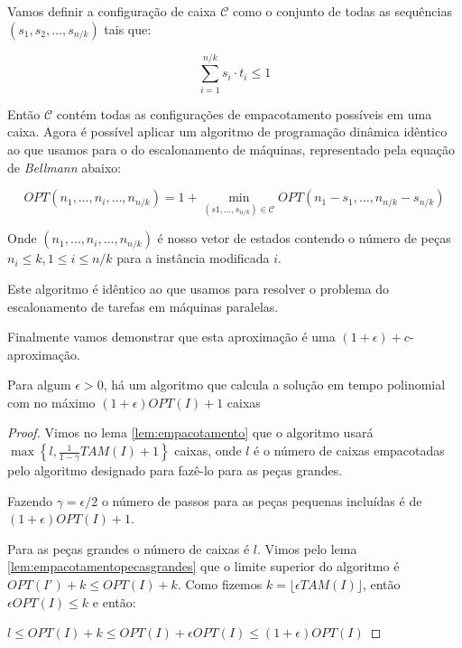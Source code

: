 Vamos definir a configuração de caixa  $ \mathcal{C} $ como o conjunto de todas as sequências $(s_1,s_2,\ldots,s_{n/k})$ tais que:

\begin{equation}
\sum_{i=1}^{n/k} s_i \cdot t_i \leq 1
\end{equation}

Então $ \mathcal{C} $ contém todas as configurações de empacotamento possíveis em uma caixa. Agora é possível aplicar um algoritmo de programação dinâmica idêntico ao que usamos para o do escalonamento de máquinas, representado pela equação de \textit{Bellmann} abaixo:

\begin{equation}
OPT(n_1, \ldots, n_i, \ldots, n_{n/k}) = 1 + \min_{(s1,\ldots,s_{n/k}) \in \mathcal{C}} OPT(n_1 - s_1, \ldots, n_{n/k} - s_{n/k})
\end{equation}

Onde $(n_1, \ldots, n_i, \ldots, n_{n/k})$ é nosso vetor de estados contendo o número de peças $n_i \leq k, 1 \leq i \leq n/k$ para a instância modificada $i$.

Este algoritmo é idêntico ao que usamos para resolver o problema do escalonamento de tarefas em máquinas paralelas.

Finalmente vamos demonstrar que esta aproximação é uma $(1+\epsilon) + c$-aproximação.

\begin{teorema}
Para algum $\epsilon > 0$, há um algoritmo que calcula a solução em tempo polinomial com no máximo $(1 + \epsilon) OPT(I) + 1$ caixas
\end{teorema}

\begin{proof}
Vimos no lema \ref{lem:empacotamento} que o algoritmo usará  $\max \left\{ l,\frac{1}{1-\gamma} TAM(I) + 1\right\}$ caixas, onde $l$ é o número de caixas empacotadas pelo algoritmo designado para fazê-lo para as peças grandes.

Fazendo $\gamma = \epsilon/2$ o número de passos para as peças pequenas incluídas é de $(1 + \epsilon) OPT(I) + 1$.

Para as peças grandes o número de caixas é $l$. Vimos pelo lema \ref{lem:empacotamentopecasgrandes} que o limite superior do algoritmo é $OPT(I')+k \leq OPT(I)+k$. Como fizemos $k = \lfloor \epsilon TAM(I) \rfloor$, então $ \epsilon OPT(I) \leq k $ e então:

$l \leq OPT(I)+k \leq OPT(I) + \epsilon OPT(I) \leq (1 + \epsilon) OPT(I)$

\end{proof}

